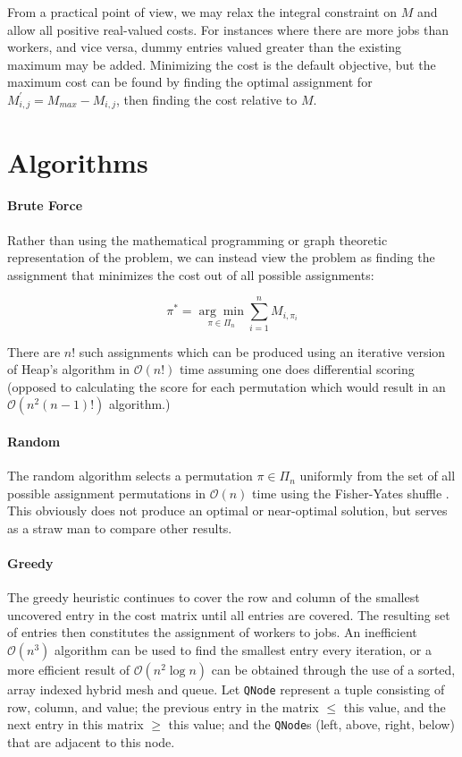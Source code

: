 \documentclass{article}
\newcommand{\boundedBy}[1]{\mathcal{O} \left ( #1 \right )}
\begin{document}
From a practical point of view, we may relax the integral constraint on $M$ and allow all positive real-valued costs. For instances where there are more jobs than workers, and vice versa, dummy entries valued greater than the existing maximum may be added. Minimizing the cost is the default objective, but the maximum cost can be found by finding the optimal assignment for $M^{\prime}_{i,j} = M_{max} - M_{i,j}$, then finding the cost relative to $M$. 

\section{Algorithms}

\paragraph{Brute Force}

Rather than using the mathematical programming or graph theoretic representation of the problem, we can instead view the problem as finding the assignment that minimizes the cost out of all possible assignments:

\begin{equation}
	\pi^{*} = \underset{\pi \in \Pi_n}{\arg\min} \sum_{i=1}^{n} M_{i, \pi_i}
\end{equation}

There are $n!$ such assignments which can be produced using an iterative version of Heap's algorithm \cite{heap1963permutations} in $\boundedBy{n!}$ time assuming one does differential scoring (opposed to calculating the score for each permutation which would result in an $\boundedBy{n^2 (n-1)!}$ algorithm.)

\paragraph{Random}

The random algorithm selects a permutation $\pi \in \Pi_n$ uniformly from the set of all possible assignment permutations in $\boundedBy{n}$ time using the Fisher-Yates shuffle \cite{durstenfeld1964algorithm}. This obviously does not produce an optimal or near-optimal solution, but serves as a straw man to compare other results.

\paragraph{Greedy}

The greedy heuristic continues to cover the row and column of the smallest uncovered entry in the cost matrix until all entries are covered. The resulting set of entries then constitutes the assignment of workers to jobs. An inefficient $\boundedBy{n^3}$ algorithm can be used to find the smallest entry every iteration, or a more efficient result of $\boundedBy{n^2 \log n}$ can be obtained through the use of a sorted, array indexed hybrid mesh and queue. Let \texttt{QNode} represent a tuple consisting of row, column, and value; the previous entry in the matrix $\le$ this value, and the next entry in this matrix $\ge$ this value; and the \texttt{QNode}s (left, above, right, below) that are adjacent to this node.
\end{document}
